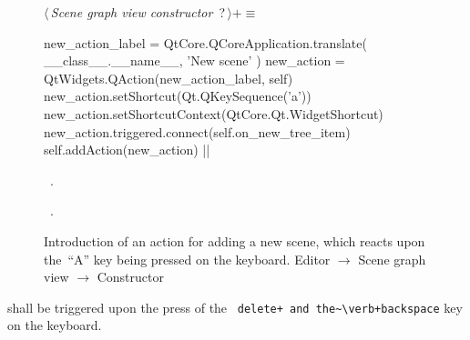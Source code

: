 \documentclass[%
    a4paper,    %
    justified,  %
    nobib,      %
    openany     %
]{tufte-book}
\begin{document}
\begin{figure}
\begin{flushleft} \small
\begin{minipage}{\linewidth}\label{scrap47}\raggedright\small
{} $\langle\,${\itshape Scene graph view constructor}\nobreak\ {\footnotesize {?}}$\,\rangle+\equiv$
\vspace{-1ex}
\begin{pythoncode}
    new_action_label = QtCore.QCoreApplication.translate(
        __class__.__name__, 'New scene'
    )
    new_action = QtWidgets.QAction(new_action_label, self)
    new_action.setShortcut(Qt.QKeySequence('a'))
    new_action.setShortcutContext(QtCore.Qt.WidgetShortcut)
    new_action.triggered.connect(self.on_new_tree_item)
    self.addAction(new_action)
|\NWsep|
\end{pythoncode}
\vspace{1.5ex}
\footnotesize
\begin{list}{}{\setlength{\itemsep}{-\parsep}\setlength{\itemindent}{-\leftmargin}}
\item \NWtxtMacroDefBy\ .
\item \NWtxtMacroRefIn\ .

\item{}
\end{list}
\end{minipage}\vspace{4ex}
\end{flushleft}
\caption{Introduction of an action for adding a new scene, which reacts upon
  the~\enquote{A} key being pressed on the keyboard.
  \newline{}\newline{}Editor $\rightarrow$ Scene graph view
  $\rightarrow$ Constructor}
\label{editor:lst:scene-graph-view:constructor:new-action}
\end{figure}

 shall be triggered upon the press of
the ~\verb=delete+ and the~\verb+backspace= key on the keyboard.
\end{document}
